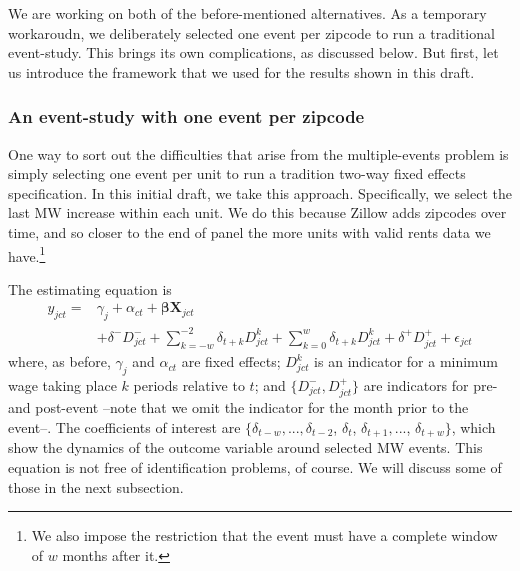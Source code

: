     We are working on both of the before-mentioned alternatives. As a temporary workaroudn, we deliberately selected one event per zipcode to run a traditional event-study. This brings its own complications, as discussed below. But first, let us introduce the framework that we used for the results shown in this draft.

\subsubsection{An event-study with one event per zipcode}

    One way to sort out the difficulties that arise from the multiple-events problem is simply selecting one event per unit to run a tradition two-way fixed effects specification. In this initial draft, we take this approach.  Specifically, we select the last MW increase within each unit. We do this because Zillow adds zipcodes over time, and so closer to the end of panel the more units with valid rents data we have.\footnote{We also impose the restriction that the event must have a complete window of $w$ months after it.}
    
    The estimating equation is
    \begin{equation}\label{eq:last-event-study}
        \begin{split}
            y_{jct} = & \gamma_{j} + \alpha_{ct} + \boldsymbol{\beta} \boldsymbol{X}_{jct} \\
            & + \delta^{-} D_{jct}^{-} + \sum\limits_{k = -w}^{-2}\delta_{t + k}D_{jct}^k + \sum\limits_{k = 0}^{w}\delta_{t + k} D_{jct}^k + \delta^{+} D_{jct}^{+} + \epsilon_{jct} 
        \end{split}   
    \end{equation}
    where, as before, $\gamma_{j}$ and $\alpha_{ct}$ are fixed effects; $D_{jct}^k$ is an indicator for a minimum wage taking place $k$ periods relative to $t$; and $\{D_{jct}^{-}, D_{jct}^{+}\}$ are indicators for pre- and post-event --note that we omit the indicator for the month prior to the event--. The coefficients of interest are $\{\delta_{t-w}, ..., \delta_{t-2}$, $\delta_t$, $\delta_{t+1}, ...$, $\delta_{t+w}\}$, which show the dynamics of the outcome variable around selected MW events. This equation is not free of identification problems, of course. We will discuss some of those in the next subsection.
    
